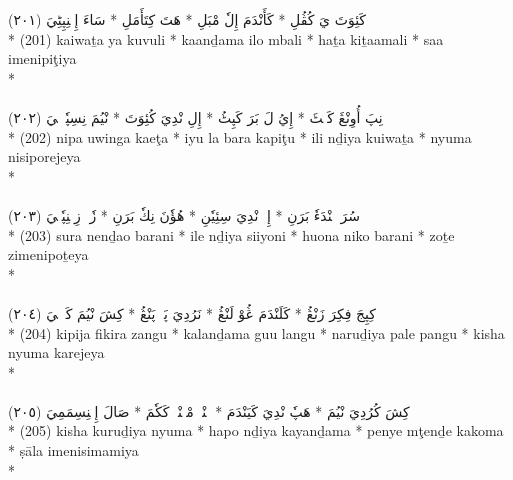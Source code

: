 \documentclass[a4paper, 12pt]{report}
\begin{document}
\begin{center}
\textarabic{(٢٠١) \textcolor{mygreen}{كَئِوَتَ يَ كُڤُلِ  * كَأَنْدَمَ إِلٗ مْبَلِ  * هَتَ كِتَأَمَلِ  * سَاءَ إِمٖنِپِٹِيَ }} \\* 
(201) kaiwaṯa ya kuvuli  * kaanḏama ilo mbali  * haṯa kiṯaamali  * saa imenipiţiya  \\* 
 \\ 
\\[8mm] 

\textarabic{(٢٠٢) \textcolor{mygreen}{نِپَ أُوِنْڠَ كَئٖٹَ  * إِيُ لَ بَرَ كَپِٹُ  * إِلِ نْدِيَ كُئِوَتَ  * نْيُمَ نِسِپٗرٖجٖيَ }} \\* 
(202) nipa uwinga kaeţa  * iyu la bara kapiţu  * ili nḏiya kuiwaṯa  * nyuma nisiporejeya  \\* 
 \\ 
\\[8mm] 

\textarabic{(٢٠٣) \textcolor{mygreen}{سُرَ نٖنْدَءٗ بَرَنِ  * إِلٖ نْدِيَ سِئِيٗنِ  * هُؤٗنَ نِكٗ بَرَنِ  * زٗتٖ زِمٖنِپٗتٖيَ }} \\* 
(203) sura nenḏao barani  * ile nḏiya siiyoni  * huona niko barani  * zoṯe zimenipoṯeya  \\* 
 \\ 
\\[8mm] 

\textarabic{(٢٠٤) \textcolor{mygreen}{كِپِجَ فِكِرَ زَنْڠُ  * كَلَنْدَمَ ڠُوْ لَنْڠُ  * نَرُدِيَ پَلٖ پَنْڠُ  * كِشَ نْيُمَ كَرٖجٖيَ }} \\* 
(204) kipija fikira zangu  * kalanḏama guu langu  * naruḏiya pale pangu  * kisha nyuma karejeya  \\* 
 \\ 
\\[8mm] 

\textarabic{(٢٠٥) \textcolor{mygreen}{كِشَ كُرُدِيَ نْيُمَ  * هَپٗ نْدِيَ كَيَنْدَمَ  * پٖنْيٖ مْٹٖنْدٖ كَكٗمَ  * صَالَ إِمٖنِسِمَمِيَ }} \\* 
(205) kisha kuruḏiya nyuma  * hapo nḏiya kayanḏama  * penye mţenḏe kakoma  * ṣāla imenisimamiya  \\* 
 \\ 
\\[8mm] 


\end{center}
\end{document}
